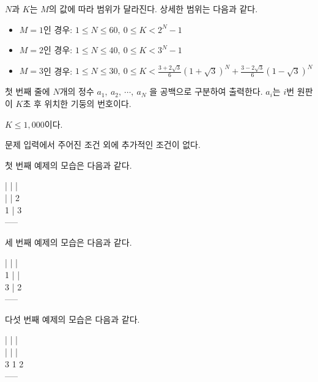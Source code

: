 \begin{problem}{\kcpchanosamtitle}
    $ N $과 $ K $는 $ M $의 값에 따라 범위가 달라진다. 상세한 범위는 다음과 같다.
    
    
    \begin{itemize}
        \item $ M = 1 $인 경우: $ 1 \leq N \leq 60,\ 0 \leq K < 2^N-1 $
        \item $ M = 2 $인 경우: $ 1 \leq N \leq 40,\ 0 \leq K < 3^N-1 $
        \item $ M = 3 $인 경우: $ 1 \leq N \leq 30,\ 0 \leq K < \frac{3+2\sqrt{3}}{6}(1+\sqrt{3})^N + \frac{3-2\sqrt{3}}{6}(1-\sqrt{3})^N $
    \end{itemize}
    
    \OutputFile
    첫 번째 줄에 $ N $개의 정수 $ a_1,\ a_2,\ \cdots,\ a_N $ 을 공백으로 구분하여 출력한다. $ a_i $는 $ i $번 원판이 $ K $초 후 위치한 기둥의 번호이다.
    
    \SubtaskWithScore{\kcpchanosamsmallscore}
    $ K \leq 1,000 $이다.
    
    \SubtaskWithScore{\kcpchanosamlargescore}
    문제 입력에서 주어진 조건 외에 추가적인 조건이 없다.

    \Examples
    
    \begin{example}
    \end{example}
    
    \Explanation
    첫 번째 예제의 모습은 다음과 같다.
    \begin{center}
        \ttfamily
        | | |\\
        | | 2\\
        1 | 3\\
        -----\\
    \end{center}
    세 번째 예제의 모습은 다음과 같다.
    \begin{center}
        \ttfamily
        | | |\\
        1 | |\\
        3 | 2\\
        -----\\
    \end{center}
    다섯 번째 예제의 모습은 다음과 같다.
    \begin{center}
        \ttfamily
        | | |\\
        | | |\\
        3 1 2\\
        -----\\
    \end{center}
    
\end{problem}

